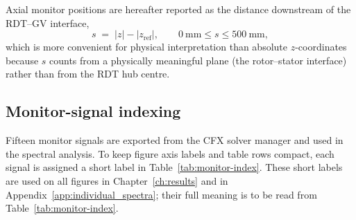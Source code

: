 Axial monitor positions are hereafter reported as the distance
downstream of the \ac{RDT}--\ac{GV} interface,
\begin{equation}
    s \;=\; |z| - |z_{\mathrm{ref}}|,
    \qquad 0~\mathrm{mm} \leq s \leq 500~\mathrm{mm},
\end{equation}
which is more convenient for physical interpretation than absolute
$z$-coordinates because $s$ counts from a physically meaningful
plane (the rotor--stator interface) rather than from the \ac{RDT}
hub centre.

\subsection{Monitor-signal indexing}
\label{sec:monitor-index}

Fifteen monitor signals are exported from the CFX solver manager and
used in the spectral analysis. To keep figure axis labels and table
rows compact, each signal is assigned a short label in
Table~\ref{tab:monitor-index}. These short labels are used on all
figures in Chapter~\ref{ch:results} and in Appendix~\ref{app:individual_spectra};
their full meaning is to be read from Table~\ref{tab:monitor-index}.

